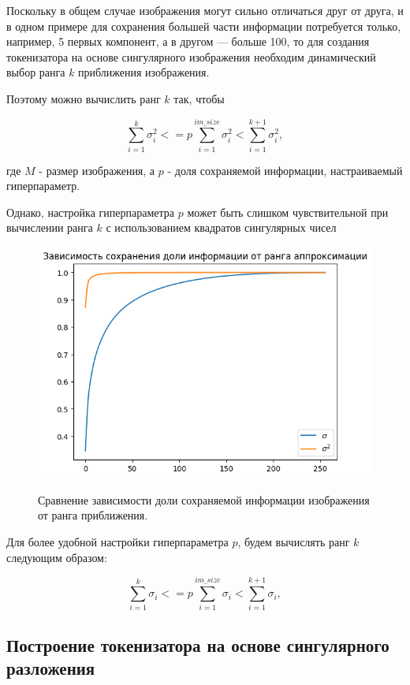 \documentclass[times,specification,annotation]{itmo-student-thesis}
\begin{document}
Поскольку в общем случае изображения могут сильно отличаться друг от друга, и в одном примере для сохранения большей части информации потребуется только, например, 5 первых компонент, а в другом --- больше 100, то для создания токенизатора на основе сингулярного изображения необходим динамический выбор ранга $k$ приближения изображения.   

Поэтому можно вычислить ранг $k$ так, чтобы

$$
    \sum_{i=1}^{k} \sigma_i^2 <= p\sum_{i=1}^{im\_size} \sigma_i^2 < \sum_{i=1}^{k+1} \sigma_i^2,
$$

где $M$ - размер изображения, а $p$ - доля сохраняемой информации, настраиваемый гиперпараметр.

Однако, настройка гиперпараметра $p$ может быть слишком чувствительной при вычислении ранга $k$ с использованием квадратов сингулярных чисел

\begin{figure}[H]
    \centering
    \includegraphics[width=1.0\textwidth]
    {images/solutions_analysis/svd/svd_lin_vs_square.png}
    \label{fig:svd_lin_vs_square}
    \caption{Сравнение зависимости доли сохраняемой информации изображения от ранга приближения.}
\end{figure}

Для более удобной настройки гиперпараметра $p$, будем вычислять ранг $k$ следующим образом:

$$
    \sum_{i=1}^{k} \sigma_i <= p\sum_{i=1}^{im\_size} \sigma_i < \sum_{i=1}^{k+1} \sigma_i,
$$

\subsection{Построение токенизатора на основе сингулярного разложения}
\end{document}
